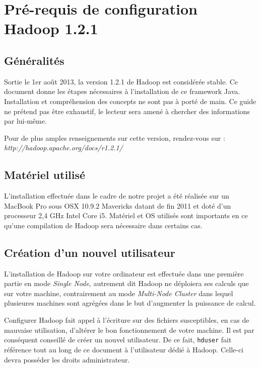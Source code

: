 \section{Pré-requis de configuration Hadoop 1.2.1}

\subsection{Généralités}

\par Sortie le 1er août 2013, la version 1.2.1 de Hadoop est considérée stable. Ce document donne les étapes nécessaires à l'installation de ce framework Java. Installation et compréhension des concepts ne sont pas à porté de main. Ce guide ne prétend pas être exhaustif, le lecteur sera amené à chercher des informations par lui-même.

\par Pour de plus amples renseignements sur cette version, rendez-vous sur :\\
\textit{http://hadoop.apache.org/docs/r1.2.1/}

\subsection{Matériel utilisé}

\par L'installation effectuée dans le cadre de notre projet a été réalisée sur un MacBook Pro sous OSX 10.9.2 Mavericks datant de fin 2011 et doté d'un processeur 2,4 GHz Intel Core i5. Matériel et OS utilisés sont importants en ce qu'une compilation de Hadoop sera nécessaire dans certains cas.

\subsection{Création d'un nouvel utilisateur}

\par L'installation de Hadoop sur votre ordinateur est effectuée dans une première partie en mode \textit{Single Node}, autrement dit Hadoop ne déploiera ses calculs que sur votre machine, contrairement au mode \textit{Multi-Node Cluster} dans lequel plusieures machines sont agrégées dans le but d'augmenter la puissance de calcul.

\par Configurer Hadoop fait appel à l'écriture sur des fichiers susceptibles, en cas de mauvaise utilisation, d'altérer le bon fonctionnement de votre machine. Il est par conséquent conseillé de créer un nouvel utilisateur. De ce fait, \texttt{hduser} fait référence tout au long de ce document à l'utilisateur dédié à Hadoop. Celle-ci devra posséder les droits administrateur.

